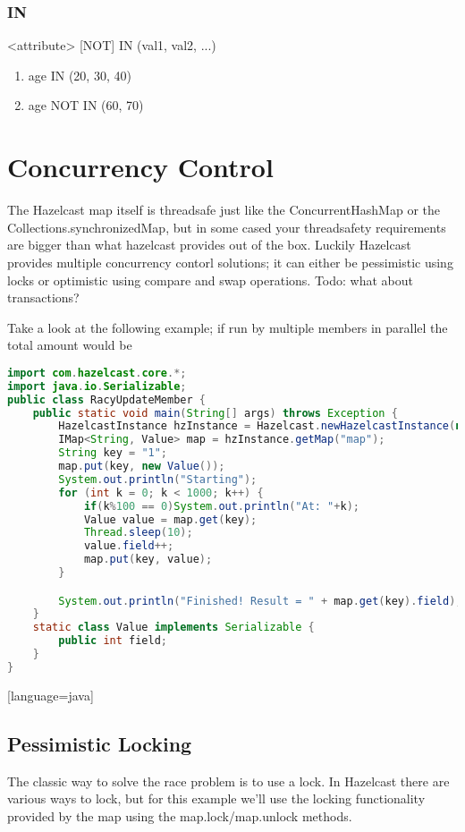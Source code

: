 \subsubsection{IN}
<attribute> [NOT] IN (val1, val2, ...)
\begin{enumerate}
\item age IN (20, 30, 40)
\item age NOT IN (60, 70)
\end{enumerate}

\section{Concurrency Control}
The Hazelcast map itself is threadsafe just like the ConcurrentHashMap or the Collections.synchronizedMap, but in some cased your threadsafety requirements are bigger than what hazelcast provides out of the box. Luckily Hazelcast provides multiple concurrency contorl solutions;  it can either be pessimistic using locks or optimistic using compare and swap operations. Todo: what about transactions?

Take a look at the following example; if run by multiple members in parallel the total amount would be 
\begin{lstlisting}[language=java]
import com.hazelcast.core.*;
import java.io.Serializable;
public class RacyUpdateMember {
    public static void main(String[] args) throws Exception {
        HazelcastInstance hzInstance = Hazelcast.newHazelcastInstance(null);
        IMap<String, Value> map = hzInstance.getMap("map");
        String key = "1";
        map.put(key, new Value());
        System.out.println("Starting");
        for (int k = 0; k < 1000; k++) {
            if(k%100 == 0)System.out.println("At: "+k);
            Value value = map.get(key);
            Thread.sleep(10);
            value.field++;
            map.put(key, value);
        }

        System.out.println("Finished! Result = " + map.get(key).field);
    }
    static class Value implements Serializable {
        public int field;
    }
}
\end{lstlisting}[language=java]

\subsection{Pessimistic Locking}
The classic way to solve the race problem is to use a lock. In Hazelcast there are various ways to lock, but for this example we'll use the locking functionality provided by the map using the map.lock/map.unlock methods.

